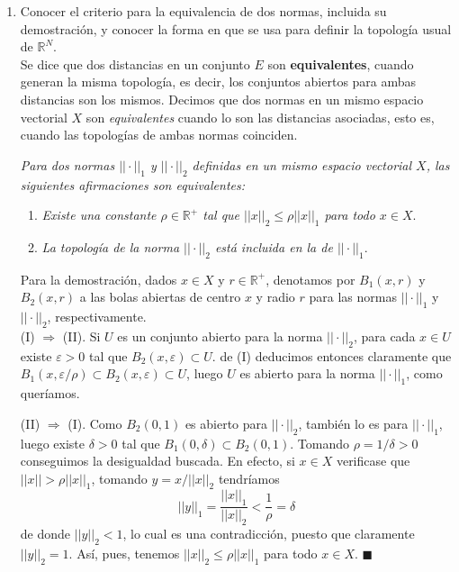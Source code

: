 \documentclass[a4paper, 12pt]{article}
\begin{document}
\begin{enumerate}[label=\textbf{\arabic*}.]
\bigskip

	\item Conocer el criterio para la equivalencia de dos normas, incluida su demostración, y conocer la forma en que se usa para definir la topología usual de \(\mathbb{R}^N\). \\
	
Se dice que dos distancias en un conjunto \(E\) son \textbf{equivalentes}, cuando generan la misma topología, es decir, los conjuntos abiertos para ambas distancias son los mismos. Decimos que dos normas en un mismo espacio vectorial \(X\) son \textit{equivalentes} cuando lo son las distancias asociadas, esto es, cuando las topologías de ambas normas coinciden.

\hspace{1cm} \textit{Para dos normas \(|| \cdot ||_1\) y \(|| \cdot ||_2\) definidas en un mismo espacio vectorial \(X\), las siguientes afirmaciones son equivalentes:}
	\begin{enumerate}[label=(\roman*)]
		\item \textit{Existe una constante \(\rho \in \mathbb{R}^+\) tal que \(||x||_2 \leq \rho ||x||_1\) para todo \(x \in X\)}.
		
		\item \textit{La topología de la norma \(|| \cdot ||_2 \) está incluida en la de \(|| \cdot ||_1\)}.
	\end{enumerate}
	
Para la demostración, dados \(x \in X\) y \(r \in \mathbb{R}^+\), denotamos por \(B_1 (x,r)\) y \(B_2 (x,r)\) a las bolas abiertas de centro \(x\) y radio \(r\) para las normas \(|| \cdot ||_1\) y \(|| \cdot ||_2\), respectivamente. \\

(I) \(\Rightarrow\) (II). Si \(U\) es un conjunto abierto para la norma \(|| \cdot ||_2\), para cada \(x \in U\) existe \(\varepsilon > 0\) tal que \(B_2 (x, \varepsilon) \subset U\). de (I) deducimos entonces claramente que \(B_1 (x, \varepsilon / \rho) \subset B_2 (x, \varepsilon) \subset U\), luego \(U\) es abierto para la norma \(|| \cdot ||_1\), como queríamos.

(II) \(\Rightarrow\) (I). Como \(B_2(0,1)\) es abierto para \(|| \cdot ||_2\), también lo es para \(|| \cdot ||_1\), luego existe \(\delta > 0\) tal que \(B_1 (0, \delta) \subset B_2 (0,1)\). Tomando \(\rho = 1/\delta > 0\) conseguimos la desigualdad buscada. En efecto, si \(x \in X\) verificase que \(||x|| > \rho ||x||_1\), tomando \(y = x / ||x||_2\) tendríamos
\[
	||y||_1 = \frac{||x||_1}{||x||_2} < \frac{1}{\rho} = \delta
\]
de donde \(||y||_2 < 1\), lo cual es una contradicción, puesto que claramente \(||y||_2 = 1\). Así, pues, tenemos \(||x||_2 \leq \rho ||x||_1\) para todo \(x \in X\). \hspace{7cm} \(\blacksquare\)


\end{enumerate}
\end{document}
